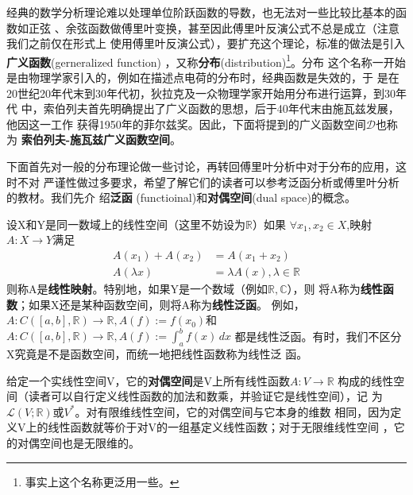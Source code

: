 \documentclass{ctexbook}
\begin{document}
经典的数学分析理论难以处理单位阶跃函数的导数，也无法对一些比较比基本的函数如正弦
、余弦函数做傅里叶变换，甚至因此傅里叶反演公式不总是成立（注意我们之前仅在形式上
使用傅里叶反演公式），要扩充这个理论，标准的做法是引入\textbf{广义函数}(gerneralized function)
，又称\textbf{分布}(distribution)\footnote{事实上这个名称更泛用一些。}。分布
这个名称一开始是由物理学家引入的，例如在描述点电荷的分布时，经典函数是失效的，于
是在20世纪20年代末到30年代初，狄拉克及一众物理学家开始用分布进行运算，到30年代
中，索伯列夫首先明确提出了广义函数的思想，后于40年代末由施瓦兹发展，他因这一工作
获得1950年的菲尔兹奖。因此，下面将提到的广义函数空间$\mathcal{D} $也称为
\textbf{索伯列夫-施瓦兹广义函数空间}。

下面首先对一般的分布理论做一些讨论，再转回傅里叶分析中对于分布的应用，这时不对
严谨性做过多要求，希望了解它们的读者可以参考泛函分析或傅里叶分析的教材。我们先介
绍\textbf{泛函} (functioinal)和\textbf{对偶空间}(dual space)的概念。

设X和Y是同一数域上的线性空间（这里不妨设为$\mathbb{R}$）如果
$\forall x_1,x_2\in X$,映射$A:X\to Y$满足
\begin{align*}
    A(x_1)+A(x_2) & =A(x_1+x_2)                        \\
    A(\lambda x)  & =\lambda A(x),\lambda\in\mathbb{R}
\end{align*}
则称A是\textbf{线性映射}。特别地，如果Y是一个数域（例如$\mathbb{R,C}$），则
将A称为\textbf{线性函数}；如果X还是某种函数空间，则将A称为\textbf{线性泛函}。
例如，$A:C([a,b],\mathbb{R})\to\mathbb{R},A(f):=f(x_0)$和$A:C([a,b],\mathbb{R})\to\mathbb{R},A(f):=\int_{a}^{b}f(x)\,dx$
都是线性泛函。有时，我们不区分X究竟是不是函数空间，而统一地把线性函数称为线性泛
函。

给定一个实线性空间V，它的\textbf{对偶空间}是V上所有线性函数$A:V\to\mathbb{R}$
构成的线性空间（读者可以自行定义线性函数的加法和数乘，并验证它是线性空间），记
为$\mathcal{L} (V;\mathbb{R})$或$V^*$。对有限维线性空间，它的对偶空间与它本身的维数
相同，因为定义V上的线性函数就等价于对V的一组基定义线性函数；对于无限维线性空间
，它的对偶空间也是无限维的。
\end{document}

